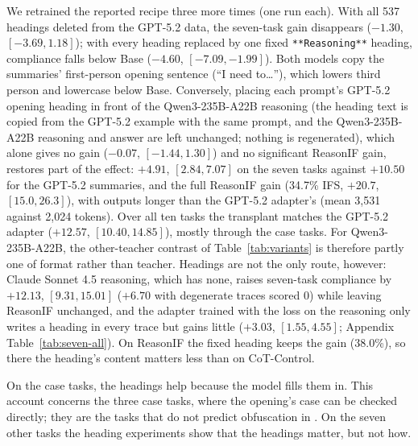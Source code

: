 We retrained the reported recipe three more times (one run each). With all 537 headings deleted from the GPT-5.2 data, the seven-task gain disappears ($-1.30$, $[-3.69, 1.18]$); with every heading replaced by one fixed \texttt{**Reasoning**} heading, compliance falls below Base ($-4.60$, $[-7.09, -1.99]$). Both models copy the summaries' first-person opening sentence (``I need to\ldots''), which lowers third person and lowercase below Base. Conversely, placing each prompt's GPT-5.2 opening heading in front of the Qwen3-235B-A22B reasoning (the heading text is copied from the GPT-5.2 example with the same prompt, and the Qwen3-235B-A22B reasoning and answer are left unchanged; nothing is regenerated), which alone gives no gain ($-0.07$, $[-1.44, 1.30]$) and no significant ReasonIF gain, restores part of the effect: $+4.91$, $[2.84, 7.07]$ on the seven tasks against $+10.50$ for the GPT-5.2 summaries, and the full ReasonIF gain (34.7\% IFS, $+20.7$, $[15.0, 26.3]$), with outputs longer than the GPT-5.2 adapter's (mean 3,531 against 2,024 tokens). Over all ten tasks the transplant matches the GPT-5.2 adapter ($+12.57$, $[10.40, 14.85]$), mostly through the case tasks. For Qwen3-235B-A22B, the other-teacher contrast of Table~\ref{tab:variants} is therefore partly one of format rather than teacher. Headings are not the only route, however: Claude Sonnet 4.5 reasoning, which has none, raises seven-task compliance by $+12.13$, $[9.31, 15.01]$ ($+6.70$ with degenerate traces scored 0) while leaving ReasonIF unchanged, and the adapter trained with the loss on the reasoning only writes a heading in every trace but gains little ($+3.03$, $[1.55, 4.55]$; Appendix Table~\ref{tab:seven-all}). On ReasonIF the fixed heading keeps the gain (38.0\%), so there the heading's content matters less than on CoT-Control.

On the case tasks, the headings help because the model fills them in.
 This account concerns the three case tasks, where the opening's case can be checked directly; they are the tasks that do not predict obfuscation in \citet{haskins2026obfuscation}. On the seven other tasks the heading experiments show that the headings matter, but not how.
